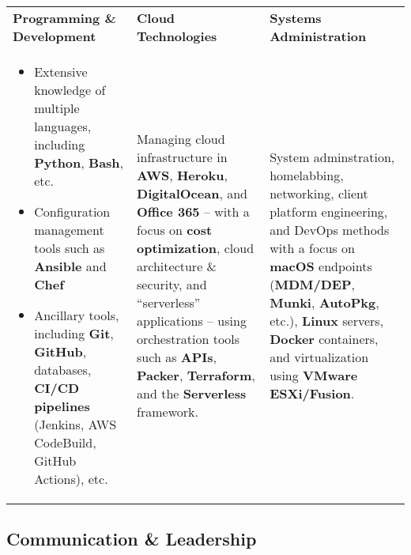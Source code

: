 \documentclass[10pt]{article}
\newcommand{\afterlistspace}[0]{\vspace{-1.5em}}
\begin{document}
\begin{tabularx}{\linewidth}{
    >{\hsize=1\hsize}X|%
    >{\hsize=1\hsize}X|%
    >{\hsize=1\hsize}X%
  }
    \textbf{Programming \& Development}
    & \textbf{Cloud Technologies}
    & \textbf{Systems Administration}
    \\
    \begin{itemize}[noitemsep,topsep=0pt]
        \vspace{-0.75em}

        \item Extensive knowledge of multiple languages, including \textbf{Python}, \textbf{Bash}, etc.

        \item Configuration management tools such as \textbf{Ansible} and \textbf{Chef}

        \item Ancillary tools, including \textbf{Git}, \textbf{GitHub}, databases, \textbf{CI/CD pipelines} (Jenkins, AWS CodeBuild, GitHub Actions), etc.
        
        \afterlistspace
    \end{itemize}

    & Managing cloud infrastructure in \textbf{AWS}, \textbf{Heroku}, \textbf{DigitalOcean}, and \textbf{Office 365} -- with a focus on \textbf{cost optimization}, cloud architecture \& security, and ``serverless'' applications -- using orchestration tools such as \textbf{APIs}, \textbf{Packer}, \textbf{Terraform}, and the \textbf{Serverless} framework.

    & System adminstration, homelabbing, networking, client platform engineering, and DevOps methods with a focus on \textbf{macOS} endpoints (\textbf{MDM/DEP}, \textbf{Munki}, \textbf{AutoPkg}, etc.), \textbf{Linux} servers, \textbf{Docker} containers, and virtualization using \textbf{VMware ESXi/Fusion}.
    
\end{tabularx}


\subsection{Communication \& Leadership}
\end{document}
